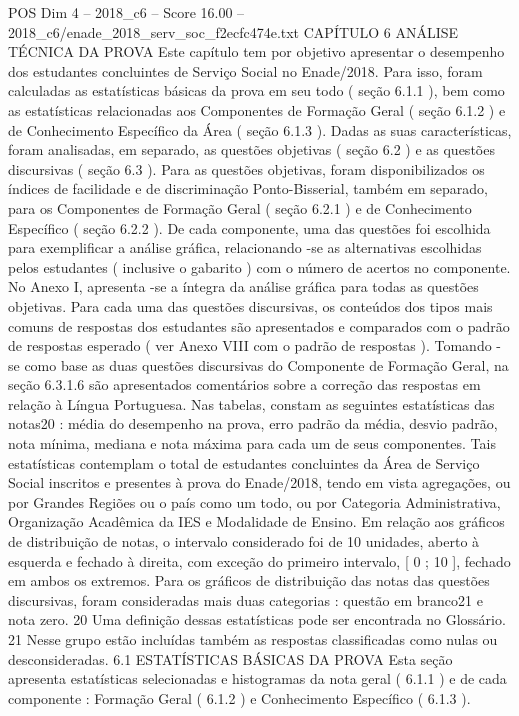 \begin{textsample}{POS Dim 4 – 2018\_c6 – Score 16.00 – 2018\_c6/enade\_2018\_serv\_soc\_f2ecfc474e.txt}  \label{ex:f4_pos_001}
CAPÍTULO 6 ANÁLISE TÉCNICA DA PROVA Este capítulo tem por objetivo apresentar o desempenho dos estudantes concluintes de Serviço Social no Enade/2018.
Para isso, foram calculadas as estatísticas básicas da prova em seu todo ( seção 6.1.1 ), bem como as estatísticas relacionadas aos Componentes de Formação Geral ( seção 6.1.2 ) e de Conhecimento Específico da Área ( seção 6.1.3 ).
Dadas as suas características, foram analisadas, em separado, as questões objetivas ( seção 6.2 ) e as questões discursivas ( seção 6.3 ).
Para as questões objetivas, foram disponibilizados os índices de facilidade e de discriminação Ponto-Bisserial, também em separado, para os Componentes de Formação Geral ( seção 6.2.1 ) e de Conhecimento Específico ( seção 6.2.2 ).
De cada componente, uma das questões foi escolhida para exemplificar a análise gráfica, relacionando -se as alternativas escolhidas pelos estudantes ( inclusive o gabarito ) com o número de acertos no componente.
No Anexo I, apresenta -se a íntegra da análise gráfica para todas as questões objetivas.
Para cada uma das questões discursivas, os conteúdos dos tipos mais comuns de respostas dos estudantes são apresentados e comparados com o padrão de respostas esperado ( ver Anexo VIII com o padrão de respostas ).
Tomando -se como base as duas questões discursivas do Componente de Formação Geral, na seção 6.3.1.6 são apresentados comentários sobre a correção das respostas em relação à Língua Portuguesa.
Nas tabelas, constam as seguintes estatísticas das notas20 : média do desempenho na prova, erro padrão da média, desvio padrão, nota mínima, mediana e nota máxima para cada um de seus componentes.
Tais estatísticas contemplam o total de estudantes concluintes da Área de Serviço Social inscritos e presentes à prova do Enade/2018, tendo em vista agregações, ou por Grandes Regiões ou o país como um todo, ou por Categoria Administrativa, Organização Acadêmica da IES e Modalidade de Ensino.
Em relação aos gráficos de distribuição de notas, o intervalo considerado foi de 10 unidades, aberto à esquerda e fechado à direita, com exceção do primeiro intervalo, [ 0 ; 10 ], fechado em ambos os extremos.
Para os gráficos de distribuição das notas das questões discursivas, foram consideradas mais duas categorias : questão em branco21 e nota zero. 20 Uma definição dessas estatísticas pode ser encontrada no Glossário. 21 Nesse grupo estão incluídas também as respostas classificadas como nulas ou desconsideradas. 6.1 ESTATÍSTICAS BÁSICAS DA PROVA Esta seção apresenta estatísticas selecionadas e histogramas da nota geral ( 6.1.1 ) e de cada componente : Formação Geral ( 6.1.2 ) e Conhecimento Específico ( 6.1.3 ).

\end{textsample}
